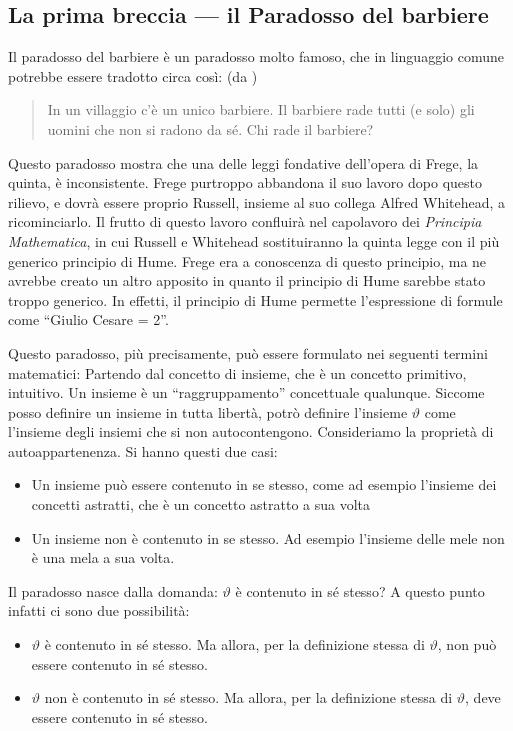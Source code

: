 \documentclass[a4paper,10pt]{article}
\begin{document}
\subsection{La prima breccia --- il Paradosso del barbiere}
Il paradosso del barbiere è un paradosso molto famoso, che in linguaggio comune potrebbe essere tradotto circa così: (da \cite{wp-paradosso-russel-it})
\begin{quotation}
In un villaggio c'è un unico barbiere. Il barbiere rade tutti (e solo) gli uomini che non si radono da sé. Chi rade il barbiere?                                                                                                                                                                                                                                           \end{quotation} 
Questo paradosso mostra che una delle leggi fondative dell'opera di Frege, la quinta, è inconsistente. Frege purtroppo abbandona il suo lavoro dopo questo rilievo, e dovrà essere proprio Russell, insieme al suo collega Alfred Whitehead, a ricominciarlo. Il frutto di questo lavoro confluirà nel capolavoro dei \textit{Principia Mathematica}, in cui Russell e Whitehead sostituiranno la quinta legge con il più generico principio di Hume. Frege era a conoscenza di questo principio, ma ne avrebbe creato un altro apposito in quanto il principio di Hume sarebbe stato troppo generico. In effetti, il principio di Hume permette l'espressione di formule come \textquotedblleft Giulio Cesare = 2\textquotedblright.

Questo paradosso, più precisamente, può essere formulato nei seguenti termini matematici:
Partendo dal concetto di insieme, che è un concetto primitivo, intuitivo. Un insieme è un “raggruppamento” concettuale qualunque. Siccome posso definire un insieme in tutta libertà, potrò definire l'insieme $\vartheta$ come l'insieme degli insiemi che si non autocontengono. Consideriamo la proprietà di autoappartenenza. Si hanno questi due casi:
\begin{itemize}
 \item Un insieme può essere contenuto in se stesso, come ad esempio l'insieme dei concetti astratti, che è un concetto astratto a sua volta
 \item Un insieme non è contenuto in se stesso. Ad esempio l'insieme delle mele non è una mela a sua volta.
\end{itemize}
Il paradosso nasce dalla domanda: $\vartheta$ è contenuto in sé stesso?
A questo punto infatti ci sono due possibilità:
\begin{itemize}
 \item $\vartheta$ è contenuto in sé stesso. Ma allora, per la definizione stessa di $\vartheta$, non può essere contenuto in sé stesso.
 \item $\vartheta$ non è contenuto in sé stesso.  Ma allora, per la definizione stessa di $\vartheta$, deve essere contenuto in sé stesso.
\end{itemize}
\end{document}
